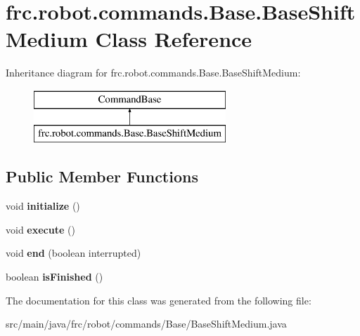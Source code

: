 \hypertarget{classfrc_1_1robot_1_1commands_1_1_base_1_1_base_shift_medium}{}\section{frc.\+robot.\+commands.\+Base.\+Base\+Shift\+Medium Class Reference}
\label{classfrc_1_1robot_1_1commands_1_1_base_1_1_base_shift_medium}
Inheritance diagram for frc.\+robot.\+commands.\+Base.\+Base\+Shift\+Medium\+:\begin{figure}[H]
\begin{center}
\leavevmode
\includegraphics[height=2.000000cm]{classfrc_1_1robot_1_1commands_1_1_base_1_1_base_shift_medium}
\end{center}
\end{figure}
\subsection*{Public Member Functions}
\begin{DoxyCompactItemize}
\item 
\mbox{\label{classfrc_1_1robot_1_1commands_1_1_base_1_1_base_shift_medium_af21b33382bc92aa1ea1a4d08c6ad683f}} 
void {\bfseries initialize} ()
\item 
\mbox{\label{classfrc_1_1robot_1_1commands_1_1_base_1_1_base_shift_medium_a7107e3f77791b29cb8e976c3b39b5292}} 
void {\bfseries execute} ()
\item 
\mbox{\label{classfrc_1_1robot_1_1commands_1_1_base_1_1_base_shift_medium_a9a8caa36d2907c73d965cc8dac3439c9}} 
void {\bfseries end} (boolean interrupted)
\item 
\mbox{\label{classfrc_1_1robot_1_1commands_1_1_base_1_1_base_shift_medium_ae4de51ed29901fb11f31abd7096bfabb}} 
boolean {\bfseries is\+Finished} ()
\end{DoxyCompactItemize}


The documentation for this class was generated from the following file\+:\begin{DoxyCompactItemize}
\item 
src/main/java/frc/robot/commands/\+Base/Base\+Shift\+Medium.\+java\end{DoxyCompactItemize}

